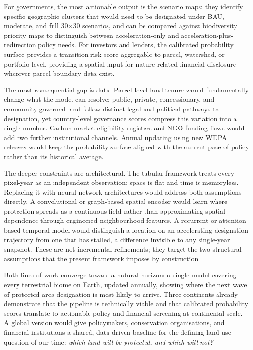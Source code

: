 \documentclass[12pt]{article}
\theoremstyle{break}
\begin{document}
For governments, the most actionable output is the scenario maps: they identify
specific geographic clusters that would need to be designated under BAU, moderate,
and full 30$\times$30 scenarios, and can be compared against biodiversity priority
maps to distinguish between acceleration-only and acceleration-plus-redirection
policy needs. For investors and lenders, the calibrated probability surface provides
a transition-risk score aggregable to parcel, watershed, or portfolio level,
providing a spatial input for nature-related financial disclosure wherever
parcel boundary data exist.

The most consequential gap is data. Parcel-level land tenure would fundamentally
change what the model can resolve: public, private, concessionary, and
community-governed land follow distinct legal and political pathways to designation,
yet country-level governance scores compress this variation into a single number.
Carbon-market eligibility registers and NGO funding flows would add two further
institutional channels. Annual
updating using new WDPA releases would keep the probability surface aligned
with the current pace of policy rather than its historical average.

The deeper constraints are architectural. The tabular framework treats every
pixel-year as an independent observation: space is flat and time is memoryless.
Replacing it with neural network architectures would address both assumptions
directly. A convolutional or graph-based spatial encoder would learn where
protection spreads as a continuous field rather than approximating spatial
dependence through engineered neighbourhood features. A recurrent or
attention-based temporal model would distinguish a location on an accelerating
designation trajectory from one that has stalled, a difference invisible to any
single-year snapshot. These are not incremental refinements; they target the two
structural assumptions that the present framework imposes by construction.

Both lines of work converge toward a natural horizon: a single model covering
every terrestrial biome on Earth, updated annually, showing where the next wave
of protected-area designation is most likely to arrive. Three continents already
demonstrate that the pipeline is technically viable and that calibrated probability
scores translate to actionable policy and financial screening at continental scale.
A global version would give policymakers, conservation organisations, and financial
institutions a shared, data-driven baseline for the defining land-use question of
our time: \emph{which land will be protected, and which will not?}
\end{document}
